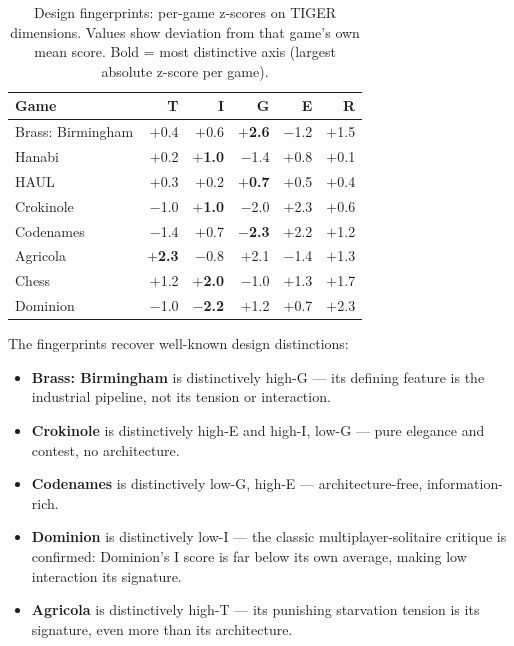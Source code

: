 \begin{table}[ht]
\centering
\caption{Design fingerprints: per-game z-scores on TIGER dimensions.
Values show deviation from that game's own mean score.
Bold = most distinctive axis (largest absolute z-score per game).}
\label{tab:fingerprints}
\begin{tabular}{lrrrrr}
\toprule
\textbf{Game} & \textbf{T} & \textbf{I} & \textbf{G} & \textbf{E} & \textbf{R} \\
\midrule
Brass: Birmingham & $+$0.4 & $+$0.6 & \textbf{$+$2.6} & $-$1.2 & $+$1.5 \\
Hanabi            & $+$0.2 & \textbf{$+$1.0} & $-$1.4 & $+$0.8 & $+$0.1 \\
HAUL              & $+$0.3 & $+$0.2 & \textbf{$+$0.7} & $+$0.5 & $+$0.4 \\
Crokinole         & $-$1.0 & \textbf{$+$1.0} & $-$2.0 & $+$2.3 & $+$0.6 \\
Codenames         & $-$1.4 & $+$0.7 & \textbf{$-$2.3} & $+$2.2 & $+$1.2 \\
Agricola          & \textbf{$+$2.3} & $-$0.8 & $+$2.1 & $-$1.4 & $+$1.3 \\
Chess             & $+$1.2 & \textbf{$+$2.0} & $-$1.0 & $+$1.3 & $+$1.7 \\
Dominion          & $-$1.0 & \textbf{$-$2.2} & $+$1.2 & $+$0.7 & $+$2.3 \\
\bottomrule
\end{tabular}
\end{table}

The fingerprints recover well-known design distinctions:
\begin{itemize}
\item \textbf{Brass: Birmingham} is distinctively high-G --- its defining feature is the
  industrial pipeline, not its tension or interaction.
\item \textbf{Crokinole} is distinctively high-E and high-I, low-G ---
  pure elegance and contest, no architecture.
\item \textbf{Codenames} is distinctively low-G, high-E --- architecture-free,
  information-rich.
\item \textbf{Dominion} is distinctively low-I --- the classic multiplayer-solitaire
  critique is confirmed: Dominion's I score is far below its own average,
  making low interaction its signature.
\item \textbf{Agricola} is distinctively high-T --- its punishing starvation tension
  is its signature, even more than its architecture.
\end{itemize}

